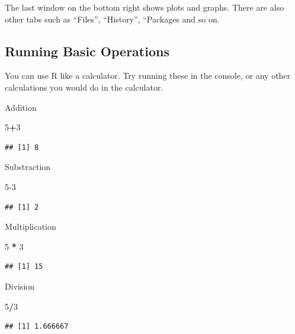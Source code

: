 \documentclass[
]{article}
\newenvironment{Shaded}{\begin{snugshade}}{\end{snugshade}}
\newcommand{\DecValTok}[1]{\textcolor[rgb]{0.00,0.00,0.81}{#1}}
\newcommand{\SpecialCharTok}[1]{\textcolor[rgb]{0.81,0.36,0.00}{\textbf{#1}}}
\begin{document}
The last window on the bottom right shows plots and graphs. There are
also other tabs such as ``Files'', ``History'', ``Packages and so on.

\subsection{Running Basic Operations}\label{running-basic-operations}

You can use R like a calculator. Try running these in the console, or
any other calculations you would do in the calculator.

Addition

\begin{Shaded}
\begin{Highlighting}[]
\DecValTok{5}\SpecialCharTok{+}\DecValTok{3}
\end{Highlighting}
\end{Shaded}

\begin{verbatim}
## [1] 8
\end{verbatim}

Substraction

\begin{Shaded}
\begin{Highlighting}[]
\DecValTok{5{-}3}
\end{Highlighting}
\end{Shaded}

\begin{verbatim}
## [1] 2
\end{verbatim}

Multiplication

\begin{Shaded}
\begin{Highlighting}[]
\DecValTok{5} \SpecialCharTok{*} \DecValTok{3}
\end{Highlighting}
\end{Shaded}

\begin{verbatim}
## [1] 15
\end{verbatim}

Division

\begin{Shaded}
\begin{Highlighting}[]
\DecValTok{5}\SpecialCharTok{/}\DecValTok{3}
\end{Highlighting}
\end{Shaded}

\begin{verbatim}
## [1] 1.666667
\end{verbatim}
\end{document}
